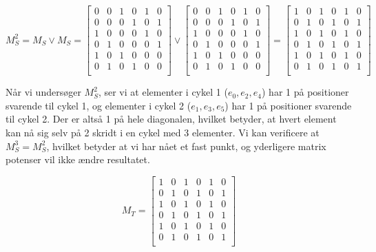 \documentclass[a4paper,12pt]{article}
\begin{document}
\[M^2_S = M_S \lor M_S = 
\begin{bmatrix}
    0 & 0 & 1 & 0 & 1 & 0 \\
    0 & 0 & 0 & 1 & 0 & 1 \\
    1 & 0 & 0 & 0 & 1 & 0 \\
    0 & 1 & 0 & 0 & 0 & 1 \\
    1 & 0 & 1 & 0 & 0 & 0 \\
    0 & 1 & 0 & 1 & 0 & 0 \\
\end{bmatrix}
\lor
\begin{bmatrix}
    0 & 0 & 1 & 0 & 1 & 0 \\
    0 & 0 & 0 & 1 & 0 & 1 \\
    1 & 0 & 0 & 0 & 1 & 0 \\
    0 & 1 & 0 & 0 & 0 & 1 \\
    1 & 0 & 1 & 0 & 0 & 0 \\
    0 & 1 & 0 & 1 & 0 & 0 \\
\end{bmatrix}
=
\begin{bmatrix}
    1 & 0 & 1 & 0 & 1 & 0 \\
    0 & 1 & 0 & 1 & 0 & 1 \\
    1 & 0 & 1 & 0 & 1 & 0 \\
    0 & 1 & 0 & 1 & 0 & 1 \\
    1 & 0 & 1 & 0 & 1 & 0 \\
    0 & 1 & 0 & 1 & 0 & 1 \\
\end{bmatrix}\]

Når vi undersøger $M^2_S$, ser vi at elementer i cykel 1 ($e_0, e_2, e_4$) har 1 på positioner svarende til cykel 1, og elementer i cykel 2 ($e_1, e_3, e_5$) har 1 på positioner svarende til cykel 2. Der er altså 1 på hele diagonalen, hvilket betyder, at hvert element kan nå sig selv på 2 skridt i en cykel med 3 elementer. Vi kan verificere at $M^3_S = M^2_S$, hvilket betyder at vi har nået et fast punkt, og yderligere matrix potenser vil ikke ændre resultatet.

\[M_T = 
\begin{bmatrix}
    1 & 0 & 1 & 0 & 1 & 0 \\
    0 & 1 & 0 & 1 & 0 & 1 \\
    1 & 0 & 1 & 0 & 1 & 0 \\
    0 & 1 & 0 & 1 & 0 & 1 \\
    1 & 0 & 1 & 0 & 1 & 0 \\
    0 & 1 & 0 & 1 & 0 & 1 \\
\end{bmatrix}\]
\end{document}
